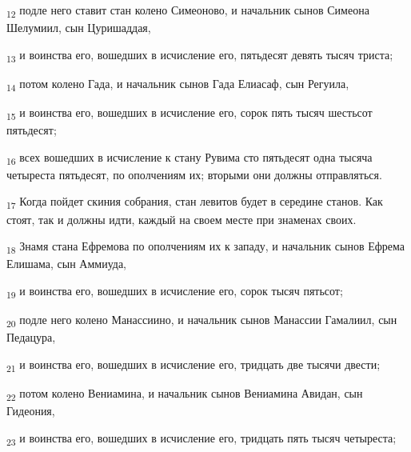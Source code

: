 \begin{tcolorbox}
\textsubscript{12} подле него ставит стан колено Симеоново, и начальник сынов Симеона Шелумиил, сын Цуришаддая,
\end{tcolorbox}
\begin{tcolorbox}
\textsubscript{13} и воинства его, вошедших в исчисление его, пятьдесят девять тысяч триста;
\end{tcolorbox}
\begin{tcolorbox}
\textsubscript{14} потом колено Гада, и начальник сынов Гада Елиасаф, сын Регуила,
\end{tcolorbox}
\begin{tcolorbox}
\textsubscript{15} и воинства его, вошедших в исчисление его, сорок пять тысяч шестьсот пятьдесят;
\end{tcolorbox}
\begin{tcolorbox}
\textsubscript{16} всех вошедших в исчисление к стану Рувима сто пятьдесят одна тысяча четыреста пятьдесят, по ополчениям их; вторыми они должны отправляться.
\end{tcolorbox}
\begin{tcolorbox}
\textsubscript{17} Когда пойдет скиния собрания, стан левитов будет в середине станов. Как стоят, так и должны идти, каждый на своем месте при знаменах своих.
\end{tcolorbox}
\begin{tcolorbox}
\textsubscript{18} Знамя стана Ефремова по ополчениям их к западу, и начальник сынов Ефрема Елишама, сын Аммиуда,
\end{tcolorbox}
\begin{tcolorbox}
\textsubscript{19} и воинства его, вошедших в исчисление его, сорок тысяч пятьсот;
\end{tcolorbox}
\begin{tcolorbox}
\textsubscript{20} подле него колено Манассиино, и начальник сынов Манассии Гамалиил, сын Педацура,
\end{tcolorbox}
\begin{tcolorbox}
\textsubscript{21} и воинства его, вошедших в исчисление его, тридцать две тысячи двести;
\end{tcolorbox}
\begin{tcolorbox}
\textsubscript{22} потом колено Вениамина, и начальник сынов Вениамина Авидан, сын Гидеония,
\end{tcolorbox}
\begin{tcolorbox}
\textsubscript{23} и воинства его, вошедших в исчисление его, тридцать пять тысяч четыреста;
\end{tcolorbox}
